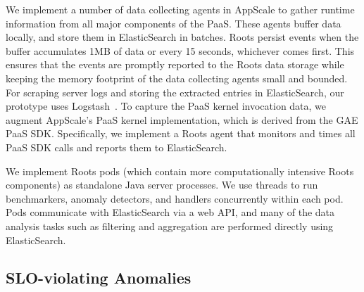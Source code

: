 We implement a number of data collecting agents in AppScale to gather runtime information
from all major components of the PaaS. These agents buffer data locally, and store them in ElasticSearch
in batches. Roots persist events when the buffer accumulates 1MB of data or every 15 seconds, whichever comes
first.  This ensures that the events are promptly reported to the Roots data
storage while keeping the memory footprint of the data collecting agents small and bounded. 
For scraping server logs and storing the extracted entries in ElasticSearch,
our prototype uses Logstash~\cite{logstash}. 
To capture the PaaS kernel invocation data, we augment AppScale's PaaS kernel implementation,
which is derived from the GAE PaaS SDK. Specifically, we implement a Roots agent that monitors
and times all PaaS SDK calls and reports them to ElasticSearch. 

We implement Roots pods (which  contain more computationally intensive Roots components) 
as standalone Java server processes. We use threads to run benchmarkers,
anomaly detectors, and handlers concurrently within each pod. Pods communicate with ElasticSearch via
a web API, and many of the data analysis tasks such as filtering and aggregation are performed
directly using ElasticSearch.

\subsection{SLO-violating Anomalies}

